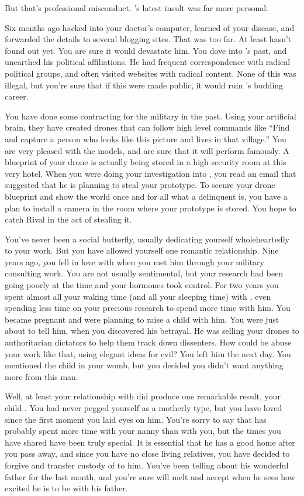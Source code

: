 \documentclass[char]{guildcamp1}
\begin{document}
But that's professional misconduct. \cRival{}'s latest insult was far more personal.

Six months ago \cRival{} hacked into your doctor's computer, learned of your disease, and forwarded the details to several blogging sites. That was too far. At least \cKid{} hasn't found out yet. You are sure it would devastate him. You dove into \cRival{}'s past, and unearthed his political affiliations. He had frequent correspondence with radical political groups, and often visited websites with radical content. None of this was illegal, but you're sure that if this were made public, it would ruin \cRival{}'s budding career.

You have done some contracting for the military in the past.  Using your artificial brain, they have created drones that can follow high level commands like ``Find and capture a person who looks like this picture and lives in that village.''  You are very pleased with the models, and are sure that it will perform famously.  A blueprint of your drone is actually being stored in a high security room at this very hotel.  When you were doing your investigation into \cRival{}, you read an email that suggested that he is planning to steal your prototype.  To secure your drone blueprint and show the world once and for all what a delinquent \cRival{} is, you have a plan to install a camera in the room where your prototype is stored.  You hope to catch Rival in the act of stealing it.

You've never been a social butterfly, usually dedicating yourself wholeheartedly to your work. But you have allowed yourself one romantic relationship.  Nine years ago, you fell in love with \cGroomA{\intro{}} when you met him through your military consulting work.  You are not usually sentimental, but your research had been going poorly at the time and your hormones took control. For two years you spent almost all your waking time (and all your sleeping time) with \cGroomA{}, even spending less time on your precious research to spend more time with him.  You became pregnant and were planning to raise a child with him. You were just about to tell him, when you discovered his betrayal.  He was selling your drones to authoritarian dictators to help them track down dissenters.  How could be abuse your work like that, using elegant ideas for evil?  You left him the next day.  You mentioned the child in your womb, but you decided you didn't want anything more from this man.
 
Well, at least your relationship with \cGroomA{} did produce one remarkable result, your child \cKid{}. You had never pegged yourself as a motherly type, but you have loved \cKid{} since the first moment you laid eyes on him.  You're sorry to say that \cKid{} has probably spent more time with your nanny than with you, but the times you have shared have been truly special.  It is essential that he has a good home after you pass away, and since you have no close living relatives, you have decided to forgive \cGroomA{} and transfer custody of \cKid{} to him.  You've been telling \cKid{} about his wonderful father for the last month, and you're sure \cGroomA{} will melt and accept \cKid{} when he sees how excited he is to be with his father.
\end{document}
